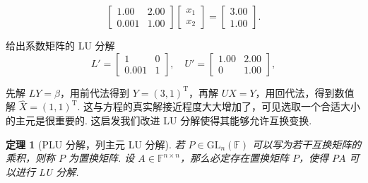 \documentclass[10pt,openany]{article}
\theoremstyle{thmstyle} %
\newtheorem{theorem}{定理}[subsection]
\theoremstyle{defstyle} %
\theoremstyle{prostyle} %
\theoremstyle{exastyle}
\theoremstyle{remstyle}
\newcommand{\T}{^{\text{T}}}
\newcommand{\F}{\mathbb{F}}
\newcommand{\gfn}{\text{GL}_n(\mathbb{F})}
\newcommand{\n}{^{n \times n}}
\begin{document}
\[ \begin{bmatrix}
	1.00 & 2.00 \\
	0.001 & 1.00 
\end{bmatrix}
\begin{bmatrix}
	x_1 \\
	x_2
\end{bmatrix}
=
\begin{bmatrix}
	3.00 \\
	1.00
\end{bmatrix}. \]

给出系数矩阵的 LU 分解
\[ L'=\begin{bmatrix}
	1 & 0 \\
	0.001 & 1
\end{bmatrix}, \quad
U' =
\begin{bmatrix}
1.00 & 2.00 \\
0 & 1.00
\end{bmatrix}, \]

先解 \( LY=\beta \)，用前代法得到 \( Y=(3,1)\T \)，再解 \( UX=Y \)，用回代法，得到数值解 \( \hat{X} = (1, 1)\T \). 这与方程的真实解接近程度大大增加了，可见选取一个合适大小的主元是很重要的. 这启发我们改进 LU 分解使得其能够允许互换变换. 

\begin{theorem}[PLU 分解，列主元 LU 分解]
	若 \( P \in \gfn \) 可以写为若干互换矩阵的乘积，则称 \( P \) 为置换矩阵. 设 \( A \in \F\n \)，那么必定存在置换矩阵 \( P \)，使得 \( PA \) 可以进行 LU 分解.
\end{theorem}
\end{document}
